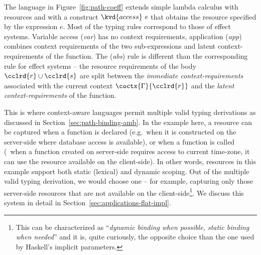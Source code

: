 The language in Figure~\ref{fig:path-coeff} extends simple lambda calculus with resources and
with a construct $\kvd{access}~e$ that obtains the resource specified by the expression $e$.
Most of the typing rules correspond to those of effect systems. Variable access (\emph{var})
has no context requirements, application (\emph{app}) combines context requirements of the two
sub-expressions and latent context-requirements of the function.
The (\emph{abs}) rule is different than the corresponding rule for effect systems -- the
resource requirements of the body $\cclrd{r} \cup \cclrd{s}$ are split between the \emph{immediate
context-requirements} associated with the current context $\coctx{\Gamma}{\cclrd{r}}$ and the
\emph{latent context-requirements} of the function.

This is where context-aware languages permit multiple valid typing derivations as discussed in
Section~\ref{sec:path-binding-amb}. In the example here, a resource can be captured
when a function is declared (e.g.~when it is constructed on the server-side where database access
is available), or when a function is called (\eg~when a function created on server-side requires
access to current time-zone, it can use the resource available on the client-side). In other words,
resources in this example support both static (lexical) and dynamic scoping. Out of the multiple
valid typing derivation, we would choose one -- for example, capturing only those server-side
resources that are not available on the client-side\footnote{This can be characterized as
``\emph{dynamic binding when possible, static binding when needed}'' and it is, quite curiously, the
opposite choice than the one used by Haskell's implicit parameters.}. We discuss this
system in detail in Section~\ref{sec:applications-flat-impl}.


